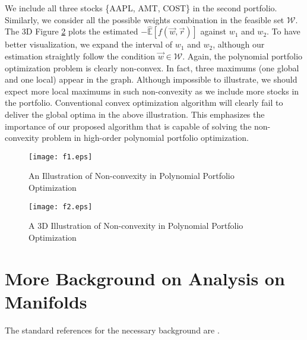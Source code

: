 We include all three stocks \{AAPL, AMT, COST\} in the second portfolio. Similarly, we consider all the possible weights combination in the feasible set $\mathcal{W}$. The 3D Figure \ref{f2} plots the estimated $ -\hat{\mathbb{E}}[f(\vec{ w}, \vec{ r})]$ against $w_1$ and $w_2$. To have better visualization, we expand the interval of $w_1$ and $w_2$, although our estimation straightly follow the condition $\vec{ w}\in\mathcal{W}$. Again, the polynomial portfolio optimization problem is clearly non-convex. In fact, three maximums (one global and one local) appear in the graph. Although impossible to illustrate, we should expect more local maximums in such non-convexity as we include more stocks in the portfolio. 
Conventional convex optimization algorithm will clearly fail to deliver the global optima in the above illustration. This emphasizes the importance of our proposed algorithm that is capable of solving the non-convexity problem in high-order polynomial portfolio optimization.

\begin{figure}[H]
\centering
\texttt{[image: f1.eps]}
\caption{An Illustration of Non-convexity in Polynomial Portfolio Optimization}\label{f1}
\end{figure}


\begin{figure}[H]
\centering
\texttt{[image: f2.eps]}
\caption{A 3D Illustration of Non-convexity in Polynomial Portfolio Optimization}\label{f2}
\end{figure}





\section{More Background on Analysis on Manifolds}
The standard references for the necessary background are \cite{JLee,Hsu}.
